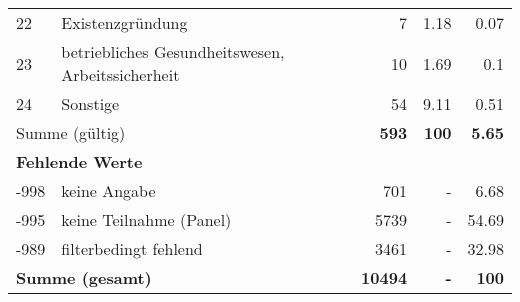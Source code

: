 \begin{longtable}{lXrrr}
        22 & \multicolumn{1}{X}{Existenzgründung} & %
          \num{7} &
          \num[round-mode=places,round-precision=2]{1.18} &
          \num[round-mode=places,round-precision=2]{0.07} \\

        23 & \multicolumn{1}{X}{betriebliches Gesundheitswesen, Arbeitssicherheit} & %
          \num{10} &
          \num[round-mode=places,round-precision=2]{1.69} &
          \num[round-mode=places,round-precision=2]{0.1} \\

        24 & \multicolumn{1}{X}{Sonstige} & %
          \num{54} &
          \num[round-mode=places,round-precision=2]{9.11} &
          \num[round-mode=places,round-precision=2]{0.51} \\

     \midrule
     \multicolumn{2}{l}{Summe (gültig)} &
       \textbf{\num{593}} &
     \textbf{\num{100}} &
       \textbf{\num[round-mode=places,round-precision=2]{5.65}} \\
     \multicolumn{5}{l}{\textbf{Fehlende Werte}}\\
       -998 &
       keine Angabe &
         \num{701} &
        - &
         \num[round-mode=places,round-precision=2]{6.68} \\
       -995 &
       keine Teilnahme (Panel) &
         \num{5739} &
        - &
         \num[round-mode=places,round-precision=2]{54.69} \\
       -989 &
       filterbedingt fehlend &
         \num{3461} &
        - &
         \num[round-mode=places,round-precision=2]{32.98} \\
     \midrule
     \multicolumn{2}{l}{\textbf{Summe (gesamt)}} &
          \textbf{\num{10494}} &
        \textbf{-} &
        \textbf{\num{100}} \\
     \bottomrule
     \end{longtable}
     
